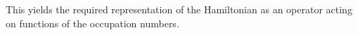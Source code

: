 This yields the required representation of the Hamiltonian as an operator
acting on functions of the occupation numbers.
